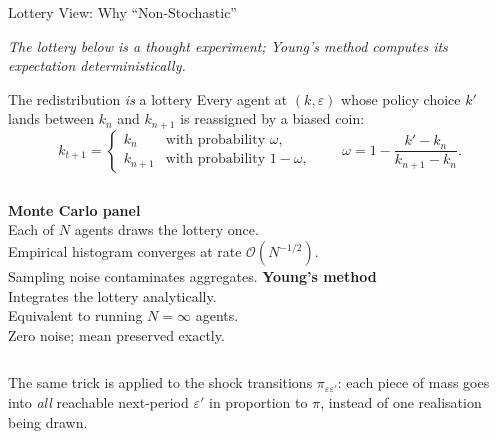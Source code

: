 \documentclass[aspectratio=169,11pt]{beamer}
\newcommand{\emphc}[1]{\textcolor{harvardcrimson}{#1}}
\begin{document}
\begin{frame}{Lottery View: Why ``Non-Stochastic''}
\small
\begin{center}\itshape\footnotesize\color{harvardcrimson}
The lottery below is a thought experiment; Young's method computes its expectation deterministically.
\end{center}
\begin{block}{The redistribution \emph{is} a lottery}
Every agent at $(k, \varepsilon)$ whose policy choice $k'$ lands between $k_n$ and $k_{n+1}$ is reassigned by a \emphc{biased coin}:
\[
k_{t+1} = \begin{cases} k_n     & \text{with probability } \omega,\\ k_{n+1} & \text{with probability } 1-\omega,\end{cases}
\qquad \omega = 1 - \frac{k' - k_n}{k_{n+1} - k_n}.
\]
\end{block}

\begin{columns}[T]
\textbf{Monte Carlo panel}\\[2pt]
Each of $N$ agents \emphc{draws the lottery once}.\\
Empirical histogram converges at rate $\mathcal{O}(N^{-1/2})$.\\
Sampling noise contaminates aggregates.
\textbf{Young's method}\\[2pt]
\emphc{Integrates the lottery analytically.}\\
Equivalent to running $N = \infty$ agents.\\
Zero noise; mean preserved exactly.
\end{columns}

\vspace{0.2em}
{\footnotesize The same trick is applied to the shock transitions $\pi_{\varepsilon\varepsilon'}$: each piece of mass goes into \emph{all} reachable next-period $\varepsilon'$ in proportion to $\pi$, instead of one realisation being drawn.}
\end{frame}
\end{document}
